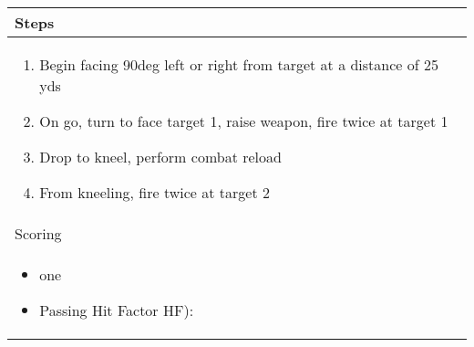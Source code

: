 \documentclass[../Cover.tex]{subfiles}
\begin{document}
	\begin{tabular}{ | p{} |}
		\hline
		\rowcolor[HTML]{C0C0C0}Steps\\ 
		\hline
		\tiny \begin{enumerate}[topsep=0pt, partopsep=0pt]
			\item  Begin facing 90deg left or right from target at a distance of 25 yds
			\item On go, turn to face target 1, raise weapon, fire twice at target 1
			\item Drop to kneel, perform combat reload
			\item From kneeling, fire twice at target 2
		\end{enumerate}		
		\\ [0.25\textheight]
		\hline
		\rowcolor[HTML]{C0C0C0}Scoring \\
		\hline
		\tiny \begin{itemize}[topsep=0pt, partopsep=0pt]
			\item one %
			\item Passing Hit Factor HF): 
		\end{itemize}		
		\\ [0.25\textheight]
		\hline
	\end{tabular}
\end{document}
